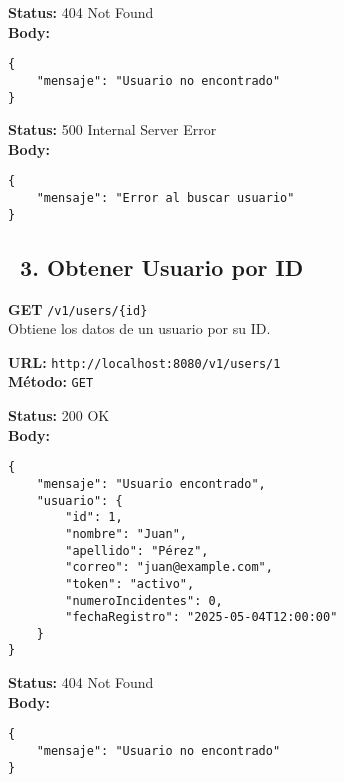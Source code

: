 \begin{tcolorbox}[response]
    \textbf{Status:} 404 Not Found\\
    \textbf{Body:}
    \begin{verbatim}
{
    "mensaje": "Usuario no encontrado"
}
    \end{verbatim}
\end{tcolorbox}

\begin{tcolorbox}[response]
    \textbf{Status:} 500 Internal Server Error\\
    \textbf{Body:}
    \begin{verbatim}
{
    "mensaje": "Error al buscar usuario"
}
    \end{verbatim}
\end{tcolorbox}

\subsection*{\faServer\ 3. Obtener Usuario por ID}
\begin{tcolorbox}[endpoint]
    \textbf{GET} \texttt{/v1/users/\{id\}}\\
    Obtiene los datos de un usuario por su ID.
\end{tcolorbox}

\begin{tcolorbox}[request]
    \textbf{URL:} \textcolor{urlColor}{\texttt{http://localhost:8080/v1/users/1}}\\
    \textbf{Método:} \textcolor{methodColor}{\texttt{GET}}
\end{tcolorbox}

\begin{tcolorbox}[response]
    \textbf{Status:} 200 OK\\
    \textbf{Body:}
    \begin{verbatim}
{
    "mensaje": "Usuario encontrado",
    "usuario": {
        "id": 1,
        "nombre": "Juan",
        "apellido": "Pérez",
        "correo": "juan@example.com",
        "token": "activo",
        "numeroIncidentes": 0,
        "fechaRegistro": "2025-05-04T12:00:00"
    }
}
    \end{verbatim}
\end{tcolorbox}

\begin{tcolorbox}[response]
    \textbf{Status:} 404 Not Found\\
    \textbf{Body:}
    \begin{verbatim}
{
    "mensaje": "Usuario no encontrado"
}
    \end{verbatim}
\end{tcolorbox}


